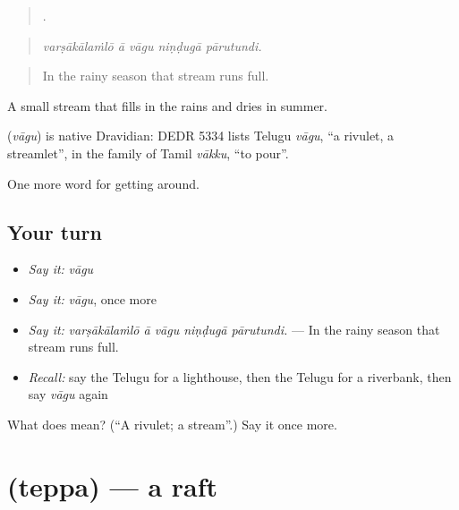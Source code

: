 \begin{quote}
    .
\end{quote}

\begin{quote}
\emph{varṣākālaṁlō ā vāgu niṇḍugā pārutundi.}
\end{quote}

\begin{quote}
In the rainy season that stream runs full.
\end{quote}

A small stream that fills in the rains and dries in summer.

\begin{cousinweb}
\textbf{} (\emph{vāgu}) is native Dravidian: DEDR 5334 lists Telugu \emph{vāgu}, \textquotedblleft{}a rivulet, a streamlet\textquotedblright{}, in the family of Tamil \emph{vākku}, \textquotedblleft{}to pour\textquotedblright{}.
\end{cousinweb}

\begin{grammarlens}[title={What you've built}]
One more word for getting around.
\end{grammarlens}

\subsection*{Your turn}
\begin{itemize}
\raggedright
  \item \emph{Say it:} \emph{vāgu}
  \item \emph{Say it:} \emph{vāgu}, once more
  \item \emph{Say it:} \emph{varṣākālaṁlō ā vāgu niṇḍugā pārutundi.} — In the rainy season that stream runs full.
  \item \emph{Recall:} say the Telugu for a lighthouse, then the Telugu for a riverbank, then say \emph{vāgu} again
\end{itemize}

\begin{tcolorbox}[breakable,colback=teal!4,colframe=teal!35!black,title={Before you move on}]
What does  mean? (\textquotedblleft{}A rivulet; a stream\textquotedblright{}.) Say it once more.
\end{tcolorbox}
\section[\texorpdfstring{\te{తెప్ప} (teppa)}{తెప్ప (teppa)}]{ (teppa) — a raft}

